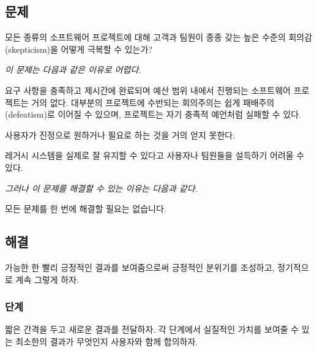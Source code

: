 \documentclass[a4paper,10pt,twoside]{book}
\begin{document}


\subsection*{문제}

모든 종류의 소프트웨어 프로젝트에 대해 고객과 팀원이 종종 갖는 높은 수준의 회의감(skepticism)을 어떻게 극복할 수 있는가?

\emph{이 문제는 다음과 같은 이유로 어렵다.}

\begin{bulletlist}
\item 요구 사항을 충족하고 제시간에 완료되며 예산 범위 내에서 진행되는 소프트웨어 프로젝트는 거의 없다. 대부분의 프로젝트에 수반되는 회의주의는 쉽게 패배주의(defeatism)로 이어질 수 있으며, 프로젝트는 자기 충족적 예언처럼 실패할 수 있다.

\item 사용자가 진정으로 원하거나 필요로 하는 것을 거의 얻지 못한다.

\item 레거시 시스템을 실제로 잘 유지할 수 있다고 사용자나 팀원들을 설득하기 어려울 수 있다.
\end{bulletlist}

\emph{그러나 이 문제를 해결할 수 있는 이유는 다음과 같다.}

\begin{bulletlist}
\item 모든 문제를 한 번에 해결할 필요는 없습니다.
\end{bulletlist}

\subsection*{해결}

가능한 한 빨리 긍정적인 결과를 보여줌으로써 긍정적인 분위기를 조성하고, 정기적으로 계속 그렇게 하자.

\subsubsection*{단계}

짧은 간격을 두고 새로운 결과를 전달하자. 각 단계에서 실질적인 가치를 보여줄 수 있는 최소한의 결과가 무엇인지 사용자와 함께 합의하자.
\end{document}

